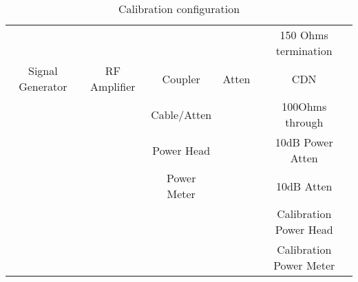 \begin{table}[h!]
\centering
\begin{tabular}{||c c c c c||}
\hline
& & & & 150 Ohms termination \\
Signal Generator & RF Amplifier & Coupler & Atten & CDN \\
& & Cable/Atten & & 100Ohms through \\
& & Power Head  & & 10dB Power Atten \\
& & Power Meter & & 10dB Atten \\
& & & & Calibration Power Head \\
& & & & Calibration Power Meter \\
\hline
\end{tabular}
\caption{Calibration configuration}
\label{table:4}
\end{table}
